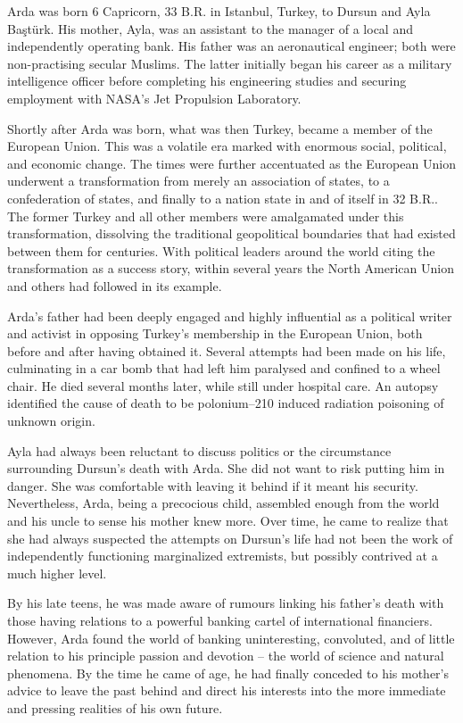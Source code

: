 Arda was born 6 Capricorn, 33 B.R. in Istanbul, Turkey, to Dursun and Ayla Baştürk. His mother, Ayla, was an assistant to the manager of a local and independently operating bank. His father was an aeronautical engineer; both were non-practising secular Muslims. The latter initially began his career as a military intelligence officer before completing his engineering studies and securing employment with NASA's Jet Propulsion Laboratory.

Shortly after Arda was born, what was then Turkey, became a member of the European Union. This was a volatile era marked with enormous social, political, and economic change. The times were further accentuated as the European Union underwent a transformation from merely an association of states, to a confederation of states, and finally to a nation state in and of itself in 32 B.R.. The former Turkey and all other members were amalgamated under this transformation, dissolving the traditional geopolitical boundaries that had existed between them for centuries. With political leaders around the world citing the transformation as a success story, within several years the North American Union and others had followed in its example.

Arda's father had been deeply engaged and highly influential as a political writer and activist in opposing Turkey's membership in the European Union, both before and after having obtained it. Several attempts had been made on his life, culminating in a car bomb that had left him paralysed and confined to a wheel chair. He died several months later, while still under hospital care. An autopsy identified the cause of death to be polonium--210 induced radiation poisoning of unknown origin.

Ayla had always been reluctant to discuss politics or the circumstance surrounding Dursun's death with Arda. She did not want to risk putting him in danger. She was comfortable with leaving it behind if it meant his security. Nevertheless, Arda, being a precocious child, assembled enough from the world and his uncle to sense his mother knew more. Over time, he came to realize that she had always suspected the attempts on Dursun's life had not been the work of independently functioning marginalized extremists, but possibly contrived at a much higher level.

By his late teens, he was made aware of rumours linking his father's death with those having relations to a powerful banking cartel of international financiers. However, Arda found the world of banking uninteresting, convoluted, and of little relation to his principle passion and devotion -- the world of science and natural phenomena. By the time he came of age, he had finally conceded to his mother's advice to leave the past behind and direct his interests into the more immediate and pressing realities of his own future.

